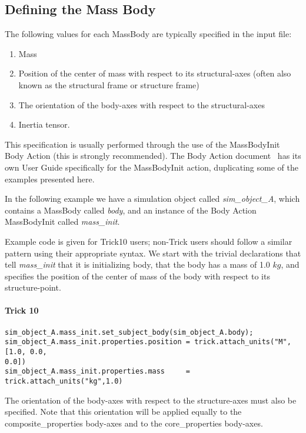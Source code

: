 \subsection{Defining the Mass Body}
The following values for each MassBody are typically specified in the input
file:
 \begin{enumerate}
   \item Mass
   \item Position of the center of mass with respect to its structural-axes
   (often also known as the structural frame or structure frame)
   \item The orientation of the body-axes with respect to the
   structural-axes
   \item Inertia tensor.
   \end{enumerate}

This specification is usually performed through the use of the MassBodyInit
Body Action (this is strongly recommended).  The Body Action
document~\cite{dynenv:BODYACTION} has its own User Guide specifically for the
MassBodyInit action, duplicating some of the examples presented here.

In the following example we have a simulation object called
\textit{sim\_object\_A}, which contains a MassBody called \textit{body}, and
an instance of the Body Action MassBodyInit called \textit{mass\_init}.

Example code is given for Trick10 users; non-Trick users should
follow a similar pattern using their appropriate syntax.  We start with the
trivial declarations that tell \textit{mass\_init} that it is initializing
body, that the body has a mass of 1.0 $kg$, and specifies the position of the
center of mass of the body with respect to its structure-point.

\paragraph{Trick 10}
\begin{verbatim}
sim_object_A.mass_init.set_subject_body(sim_object_A.body);
sim_object_A.mass_init.properties.position = trick.attach_units("M",[1.0, 0.0,
0.0])
sim_object_A.mass_init.properties.mass     = trick.attach_units("kg",1.0)
\end{verbatim}

The orientation of the body-axes with respect to the structure-axes must also
be specified.  Note that this orientation will be applied equally to the
composite\_properties body-axes and to the core\_properties body-axes.

